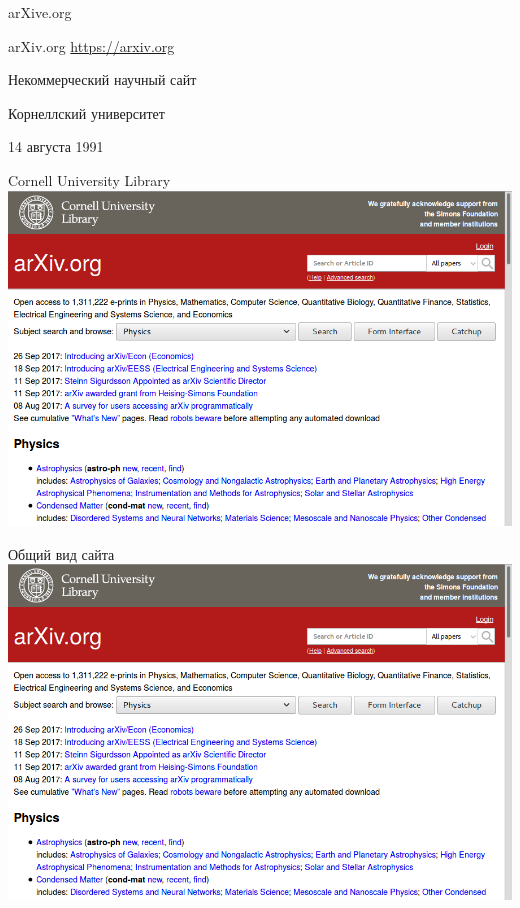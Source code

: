 \documentclass[14pt]{beamer}
\begin{document}
\begin{darkbars}
	\begin{frame}[englogoheader]{arXive.org}
	\end{frame}
\end{darkbars}

\begin{frame}{arXiv.org}
\url{https://arxiv.org}

Некоммерческий научный сайт

Корнеллский университет

14 августа 1991
\end{frame}

\begin{frame}{Cornell University Library}
\includegraphics{site}
\end{frame}

\begin{frame}{Общий вид сайта}
\includegraphics[width=\linewidth]{site}
\end{frame}
\end{document}
